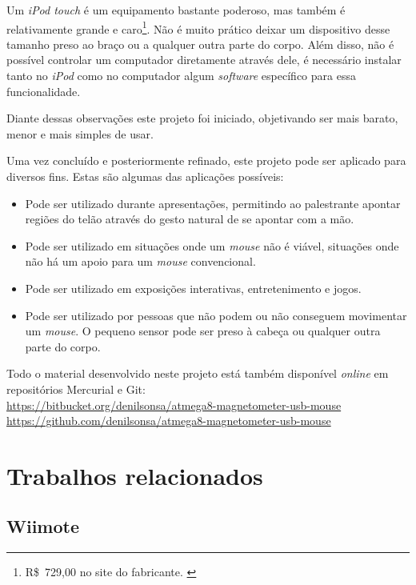 \documentclass[brazil,pagestart=firstchapter]{abnt}
\begin{document}
Um \textit{iPod touch} é um equipamento bastante poderoso, mas também é
relativamente grande e caro\footnote{
	R\$~729,00 no site do fabricante. \cite{AppleStoreiPodTouch}
}. Não é muito prático deixar um dispositivo desse tamanho preso ao braço ou
a qualquer outra parte do corpo. Além disso, não é possível controlar um
computador diretamente através dele, é necessário instalar tanto no
\textit{iPod} como no computador algum \textit{software} específico para
essa funcionalidade.

Diante dessas observações este projeto foi iniciado, objetivando ser mais
barato, menor e mais simples de usar.

Uma vez concluído e posteriormente refinado, este projeto pode ser aplicado
para diversos fins. Estas são algumas das aplicações possíveis:

\begin{itemize}
\item Pode ser utilizado durante apresentações, permitindo ao palestrante
apontar regiões do telão através do gesto natural de se apontar com a mão.
\item Pode ser utilizado em situações onde um \textit{mouse} não é viável,
situações onde não há um apoio para um \textit{mouse} convencional.
\item Pode ser utilizado em exposições interativas, entretenimento e jogos.
\item Pode ser utilizado por pessoas que não podem ou não conseguem
movimentar um \textit{mouse}. O pequeno sensor pode ser preso à cabeça ou
qualquer outra parte do corpo.
\end{itemize}

Todo o material desenvolvido neste projeto está também disponível
\textit{online} em repositórios Mercurial e Git: \\
\url{https://bitbucket.org/denilsonsa/atmega8-magnetometer-usb-mouse} \\
\url{https://github.com/denilsonsa/atmega8-magnetometer-usb-mouse}


\section{Trabalhos relacionados}
\label{sec:trabalhos_relacionados}


\subsection{Wiimote}
\label{sub:wiimote}
\end{document}
